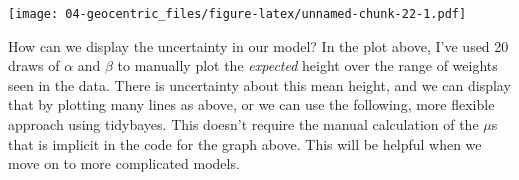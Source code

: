 \documentclass[
]{book}
\newenvironment{Shaded}{\begin{snugshade}}{\end{snugshade}}
\newcommand{\AttributeTok}[1]{\textcolor[rgb]{0.77,0.63,0.00}{#1}}
\newcommand{\CommentTok}[1]{\textcolor[rgb]{0.56,0.35,0.01}{\textit{#1}}}
\newcommand{\DecValTok}[1]{\textcolor[rgb]{0.00,0.00,0.81}{#1}}
\newcommand{\FloatTok}[1]{\textcolor[rgb]{0.00,0.00,0.81}{#1}}
\newcommand{\FunctionTok}[1]{\textcolor[rgb]{0.00,0.00,0.00}{#1}}
\newcommand{\NormalTok}[1]{#1}
\newcommand{\OtherTok}[1]{\textcolor[rgb]{0.56,0.35,0.01}{#1}}
\newcommand{\SpecialCharTok}[1]{\textcolor[rgb]{0.00,0.00,0.00}{#1}}
\newcommand{\StringTok}[1]{\textcolor[rgb]{0.31,0.60,0.02}{#1}}
\begin{document}
\begin{Shaded}
\end{Shaded}

\texttt{[image: 04-geocentric\_files/figure-latex/unnamed-chunk-22-1.pdf]}

How can we display the uncertainty in our model? In the plot above, I've used 20 draws of \(\alpha\) and \(\beta\) to manually plot the \emph{expected} height over the range of weights seen in the data. There is uncertainty about this mean height, and we can display that by plotting many lines as above, or we can use the following, more flexible approach using tidybayes. This doesn't require the manual calculation of the \(\mu\)s that is implicit in the code for the graph above. This will be helpful when we move on to more complicated models.
\end{document}
